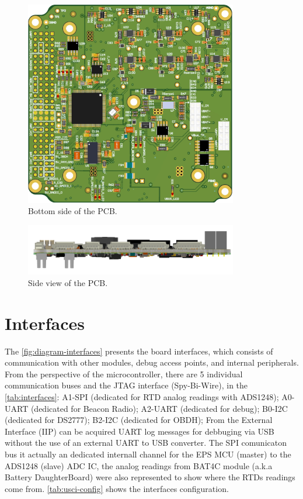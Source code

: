 \begin{figure}[!ht]
    \begin{center}
        \includegraphics[width=93mm]{figures/eps2-pcb-bottom.png}
        \caption{Bottom side of the PCB.}
        \label{fig:pcb-bottom}
    \end{center}
\end{figure}

\begin{figure}[!ht]
    \begin{center}
        \includegraphics[width=93mm]{figures/eps2-pcb-side.png}
        \caption{Side view of the PCB.}
        \label{fig:pcb-side}
    \end{center}
\end{figure}

\section{Interfaces}

The \autoref{fig:diagram-interfaces} presents the board interfaces, which consists of communication with other modules, debug access points, and internal peripherals. From the perspective of the microcontroller, there are 5 individual communication buses and the JTAG interface (Spy-Bi-Wire), in the \autoref{tab:interfaces}: A1-SPI (dedicated for RTD analog readings with ADS1248); A0-UART (dedicated for Beacon Radio); A2-UART (dedicated for debug); B0-I2C (dedicated for DS2777); B2-I2C (dedicated for OBDH); From the External Interface (IIP) can be acquired UART log messages for debbuging via USB without the use of an external UART to USB converter. The SPI comunicaton bus it actually an dedicated internall channel for the EPS MCU (master) to the ADS1248 (slave) ADC IC, the analog readings from BAT4C module (a.k.a Battery DaughterBoard) were also represented to show where the RTDs readings come from. \autoref{tab:usci-config} shows the interfaces configuration.

